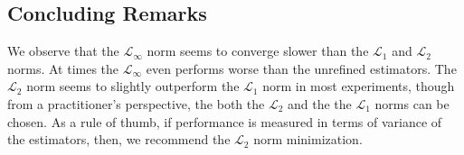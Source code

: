 \documentclass[twoside,11pt]{article}
\begin{document}
\subsection{Concluding Remarks}

We observe that the $\mathcal{L}_{\infty}$ norm seems to converge slower than the $\mathcal{L}_{1}$ and $\mathcal{L}_{2}$ norms. At times the $\mathcal{L}_{\infty}$ even performs worse than the unrefined estimators. The  $\mathcal{L}_{2}$ norm seems to slightly outperform the $\mathcal{L}_{1}$ norm in most experiments, though from a practitioner's perspective, the both the $\mathcal{L}_{2}$ and the the $\mathcal{L}_{1}$ norms can be chosen. As a rule of thumb, if performance is measured in terms of variance of the estimators, then, we recommend the $\mathcal{L}_2$ norm minimization. 
\end{document}
